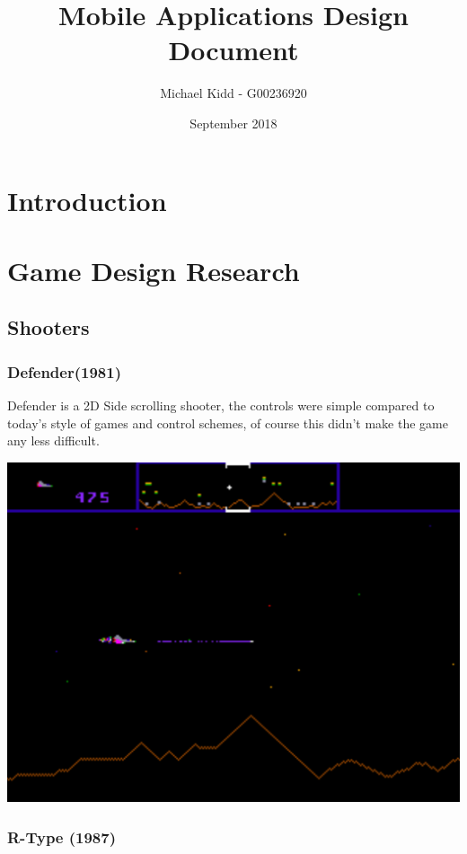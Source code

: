 \documentclass{article}
\title{Mobile Applications Design Document}
\author{Michael Kidd - G00236920}
\date{September 2018}
\begin{document}
 
\maketitle
\clearpage

\tableofcontents
\clearpage
 
\section{Introduction}
\section{Game Design Research}

\clearpage

\subsection{Shooters}
\subsubsection{Defender(1981)}

Defender is a 2D Side scrolling shooter, the controls were simple compared to today's style of games and control schemes, of course this didn't make the game any less difficult.

\includegraphics [scale=0.38]{defender}
\clearpage

\subsubsection{R-Type (1987)}
\end{document}
